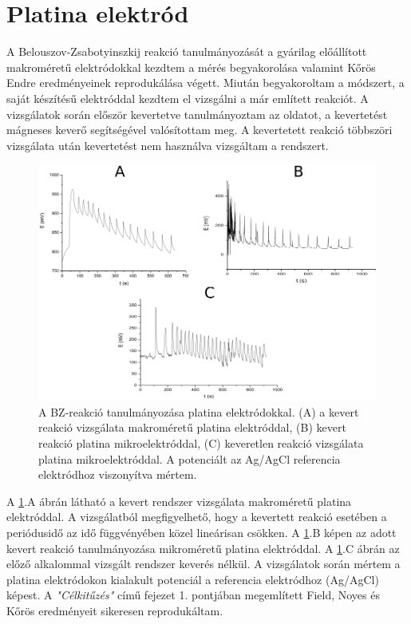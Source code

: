 \section{Platina elektród}
A Belouszov-Zsabotyinszkij reakció tanulmányozását a gyárilag előállított makroméretű elektródokkal kezdtem a mérés begyakorolása valamint Kőrös Endre eredményeinek \cite{noyes1972oscillations} reprodukálása végett. Miután begyakoroltam a módszert, a saját készítésű elektróddal kezdtem el vizsgálni a már említett reakciót. A vizsgálatok során először kevertetve tanulmányoztam az oldatot, a kevertetést mágneses keverő segítségével valósítottam meg. A kevertetett reakció többszöri vizsgálata után kevertetést nem használva vizsgáltam a rendszert.
\begin{figure}[h]
\centering
\includegraphics[width=1\textwidth]{img/platina_meres.png}
\caption{A BZ-reakció tanulmányozása platina elektródokkal. (A) a kevert reakció vizsgálata makroméretű platina elektróddal, (B) kevert reakció platina mikroelektróddal, (C) keveretlen reakció vizsgálata platina mikroelektróddal. A potenciált az Ag/AgCl referencia elektródhoz viszonyítva mértem.}
\label{fig:platina_meres}
\end{figure}
A \ref{fig:platina_meres}.A ábrán látható a kevert rendszer vizsgálata makroméretű platina elektróddal. A vizsgálatból megfigyelhető, hogy a kevertett reakció esetében a periódusidő az idő függvényében közel lineárisan csökken. A \ref{fig:platina_meres}.B képen az adott kevert reakció tanulmányozása mikroméretű platina elektróddal. A \ref{fig:platina_meres}.C ábrán az előző alkalommal vizsgált rendszer keverés nélkül. A vizsgálatok során mértem a platina elektródokon kialakult potenciál a referencia elektródhoz (Ag/AgCl) képest. A \emph{"Célkitűzés"} című fejezet 1. pontjában megemlített Field, Noyes és Kőrös eredményeit \cite{noyes1972oscillations} sikeresen reprodukáltam.  

